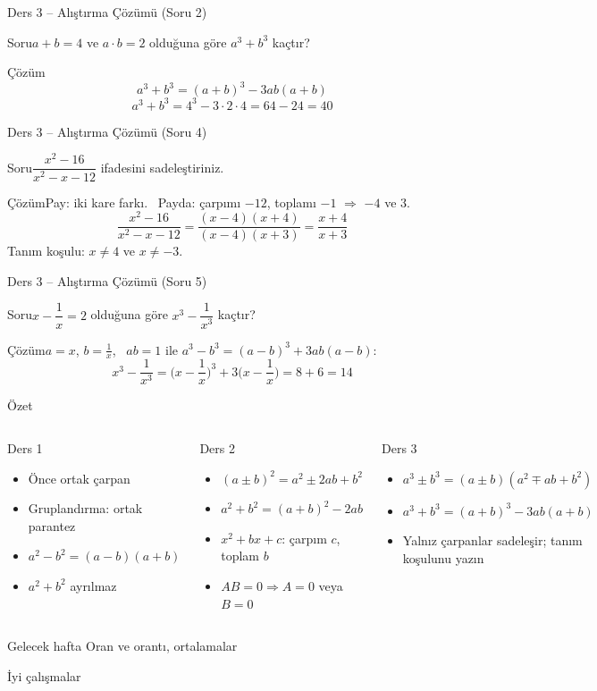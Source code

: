 \documentclass[aspectratio=169,11pt]{beamer}
\newcommand{\soru}[3]{%
\begin{frame}{#1}
  \begin{block}{Soru}\large #2\end{block}
  \pause
  \begin{exampleblock}{Çözüm}\large #3\end{exampleblock}
\end{frame}}
\begin{document}
\soru{Ders 3 -- Alıştırma Çözümü (Soru 2)}
{\(a+b=4\) ve \(a\cdot b=2\) olduğuna göre \(a^3+b^3\) kaçtır?}
{\[a^3+b^3=(a+b)^3-3ab(a+b)\]
\[a^3+b^3=4^3-3\cdot 2\cdot 4=64-24=40\]}

\soru{Ders 3 -- Alıştırma Çözümü (Soru 4)}
{\(\dfrac{x^2-16}{x^2-x-12}\) ifadesini sadeleştiriniz.}
{Pay: iki kare farkı. \ Payda: çarpımı \(-12\), toplamı \(-1\) \(\Rightarrow\) \(-4\) ve \(3\).
\[\frac{x^2-16}{x^2-x-12}=\frac{(x-4)(x+4)}{(x-4)(x+3)}=\frac{x+4}{x+3}\]
Tanım koşulu: \(x\neq 4\) ve \(x\neq -3\).}

\soru{Ders 3 -- Alıştırma Çözümü (Soru 5)}
{\(x-\dfrac{1}{x}=2\) olduğuna göre \(x^3-\dfrac{1}{x^3}\) kaçtır?}
{\(a=x\), \(b=\frac{1}{x}\), \ \(ab=1\) ile \(a^3-b^3=(a-b)^3+3ab(a-b)\):
\[x^3-\frac{1}{x^3}=\Big(x-\frac{1}{x}\Big)^3+3\Big(x-\frac{1}{x}\Big)=8+6=14\]}


\begin{frame}{Özet}
\begin{columns}[t]
\begin{block}{Ders 1}
\begin{itemize}
\item Önce ortak çarpan
\item Gruplandırma: ortak parantez
\item \(a^2-b^2=(a-b)(a+b)\)
\item \(a^2+b^2\) ayrılmaz
\end{itemize}
\end{block}
\begin{block}{Ders 2}
\begin{itemize}
\item \((a\pm b)^2=a^2\pm 2ab+b^2\)
\item \(a^2+b^2=(a+b)^2-2ab\)
\item \(x^2+bx+c\): çarpım \(c\), toplam \(b\)
\item \(AB=0\Rightarrow A=0\) veya \(B=0\)
\end{itemize}
\end{block}
\begin{block}{Ders 3}
\begin{itemize}
\item \(a^3\pm b^3=(a\pm b)(a^2\mp ab+b^2)\)
\item \(a^3+b^3=(a+b)^3-3ab(a+b)\)
\item Yalnız çarpanlar sadeleşir; tanım koşulunu yazın
\end{itemize}
\end{block}
\end{columns}
\vspace{6pt}
\begin{alertblock}{Gelecek hafta}
Oran ve orantı, ortalamalar
\end{alertblock}
\end{frame}

\begin{frame}
\centering\Large İyi çalışmalar
\end{frame}
\end{document}
